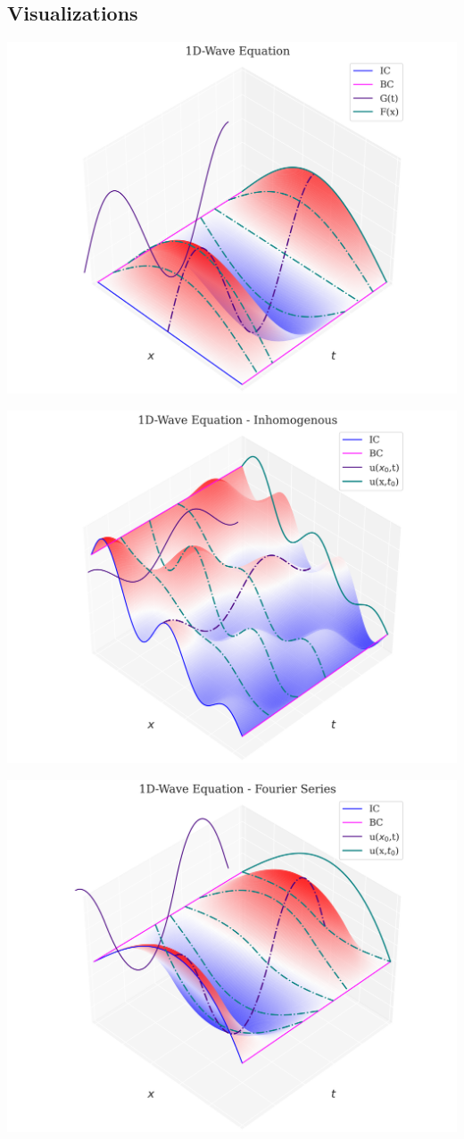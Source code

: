 \subsection{Visualizations}

\includegraphics[width=0.85\linewidth]{../images/1d_wave.png}

\includegraphics[width=0.85\linewidth]{../images/1d_wave_inhom.png}

\includegraphics[width=0.85\linewidth]{../images/1d_wave_fs.png}

